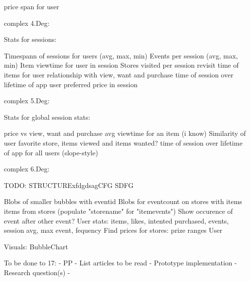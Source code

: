         price span for user

    complex 4.Deg:

        Stats for sessions:

            Timespann of sessions for users (avg, max, min)
            Events per session (avg, max, min)
            Item viewtime for user in session
            Stores visited per session
            revisit time of items for user
            relationship with view, want and purchase
            time of session over lifetime of app
            user preferred price in session

    complex 5.Deg:

        Stats for global session stats:

            price vs view, want and purchase
            avg viewtime for an item (i know)
            Similarity of user favorite store, items viewed and items wanted?
            time of session over lifetime of app for all users (slope-style)

    complex 6.Deg:

TODO: STRUCTURExfdgdsagCFG
SDFG

    Blobs of smaller bubbles with eventid
    Blobs for eventcount on stores with items items from stores (populate "storename" for "itemevents")
    Show occurence of event after other event?
    User stats: items, likes, intented purchased, events, session avg, max event, fequency
    Find prices for stores: prize ranges
    User

Visuals:
    BubbleChart

To be done to 17:
    - PP
    - List articles to be read
    - Prototype implementation
    - Research question(s)
    -

